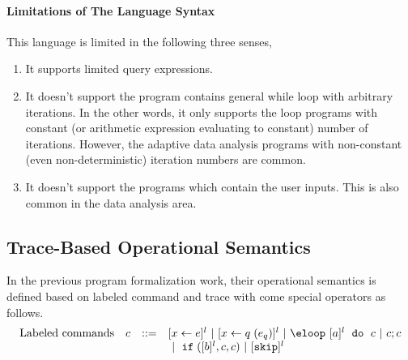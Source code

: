 \paragraph*{Limitations of The Language Syntax}
This language is limited in the following three senses,
\begin{enumerate}
\item  It supports limited query expressions.
%
\item  It doesn't support the program contains general while loop with arbitrary iterations.
In the other words, it only supports the loop programs with
constant (or arithmetic expression evaluating to constant) number of iterations.
However, the adaptive data analysis programs with non-constant (even non-deterministic) iteration numbers are common.
%
\item  It doesn't support the programs which contain the user inputs. This is also common in the data analysis area.
\end{enumerate}
%
\subsection*{Trace-Based Operational Semantics}
In the previous program formalization work, their operational semantics is defined based on labeled command and trace with come special operators as follows.
\[
\begin{array}{llll}
     \mbox{Labeled commands} & c & ::= &   [\assign x \expr]^{l} ~|~  [\assign x q(e_q)]^{l}
 ~|~  \eloop ~ [\aexpr]^{l} ~ \edo ~ c  ~|~ c;c \\
 & & & ~|~ \eif([\bexpr]^l, c, c) 	 ~|~ [\eskip]^{l} \\
\end{array}
\]

